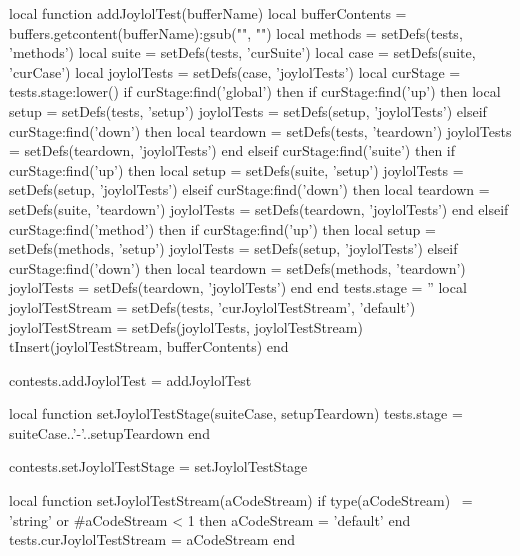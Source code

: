 \def\addJoylolTestLibDir#1{%
  \directlua{
    thirddata.contests.addJoylolTestLibDir('#1')
  }
}

\def\addJoylolTestLib#1{%
  \directlua{
    thirddata.contests.addJoylolTestLib('#1')
  }
}

\def\createJoylolTestFile#1#2#3{%
  \directlua{
    thirddata.contests.createJoylolTestFile('#1', '#2', '#3')
  }
}

\def\addJoylolTestTargets#1{%
  \directlua{
    thirddata.contests.addJoylolTestTargets('#1')
  }
}
\stopMkIVCode

\startLuaCode
local function addJoylolTest(bufferName)
  local bufferContents = buffers.getcontent(bufferName):gsub("", "\n")
  local methods        = setDefs(tests, 'methods')
  local suite          = setDefs(tests, 'curSuite')
  local case           = setDefs(suite, 'curCase')
  local joylolTests    = setDefs(case,  'joylolTests')
  local curStage       = tests.stage:lower()
  if curStage:find('global') then
    if curStage:find('up') then
      local setup      = setDefs(tests,    'setup')
      joylolTests      = setDefs(setup,    'joylolTests')
    elseif curStage:find('down') then
      local teardown   = setDefs(tests,    'teardown')
      joylolTests      = setDefs(teardown, 'joylolTests')
    end
  elseif curStage:find('suite') then
    if curStage:find('up') then
      local setup      = setDefs(suite,    'setup')
      joylolTests      = setDefs(setup,    'joylolTests')
    elseif curStage:find('down') then
      local teardown   = setDefs(suite,    'teardown')
      joylolTests      = setDefs(teardown, 'joylolTests')
    end
  elseif curStage:find('method') then
    if curStage:find('up') then
      local setup      = setDefs(methods,  'setup')
      joylolTests      = setDefs(setup,    'joylolTests')
    elseif curStage:find('down') then
      local teardown   = setDefs(methods,  'teardown')
      joylolTests      = setDefs(teardown, 'joylolTests')
    end
  end
  tests.stage            = ''
  local joylolTestStream = setDefs(tests, 'curJoylolTestStream', 'default')
  joylolTestStream       = setDefs(joylolTests, joylolTestStream)
  tInsert(joylolTestStream, bufferContents)
end

contests.addJoylolTest = addJoylolTest

local function setJoylolTestStage(suiteCase, setupTeardown)
  tests.stage = suiteCase..'-'..setupTeardown
end

contests.setJoylolTestStage = setJoylolTestStage

local function setJoylolTestStream(aCodeStream)
  if type(aCodeStream) ~= 'string'
    or #aCodeStream < 1 then
    aCodeStream = 'default'
  end
  tests.curJoylolTestStream = aCodeStream
end

